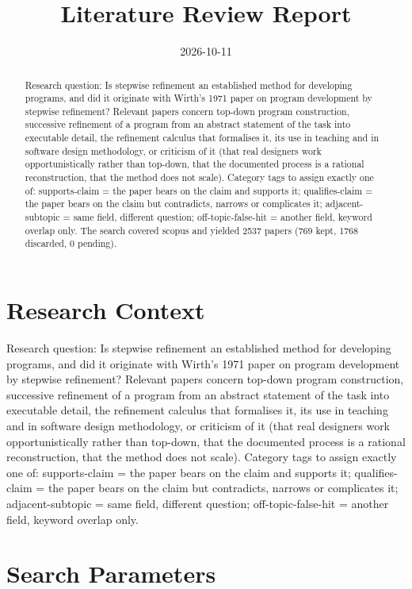 \documentclass{article}
\title{Literature Review Report}
\date{2026-10-11}
\begin{document}
\maketitle

\begin{abstract}
Research question: Is stepwise refinement an established method for developing programs, and did it originate with Wirth's 1971 paper on program development by stepwise refinement? Relevant papers concern top-down program construction, successive refinement of a program from an abstract statement of the task into executable detail, the refinement calculus that formalises it, its use in teaching and in software design methodology, or criticism of it (that real designers work opportunistically rather than top-down, that the documented process is a rational reconstruction, that the method does not scale). Category tags to assign exactly one of: supports-claim = the paper bears on the claim and supports it; qualifies-claim = the paper bears on the claim but contradicts, narrows or complicates it; adjacent-subtopic = same field, different question; off-topic-false-hit = another field, keyword overlap only. The search covered scopus and yielded 2537 papers (769 kept, 1768 discarded, 0 pending).
\end{abstract}
\clearpage
\clearpage
\tableofcontents
\clearpage

\section{Research Context}
Research question: Is stepwise refinement an established method for
developing programs, and did it originate with Wirth's 1971 paper on
program development by stepwise refinement? Relevant papers concern
top-down program construction, successive refinement of a program from
an abstract statement of the task into executable detail, the refinement
calculus that formalises it, its use in teaching and in software design
methodology, or criticism of it (that real designers work
opportunistically rather than top-down, that the documented process is a
rational reconstruction, that the method does not scale). Category tags
to assign exactly one of: supports-claim = the paper bears on the claim
and supports it; qualifies-claim = the paper bears on the claim but
contradicts, narrows or complicates it; adjacent-subtopic = same field,
different question; off-topic-false-hit = another field, keyword overlap
only.

\section{Search Parameters}
\end{document}
